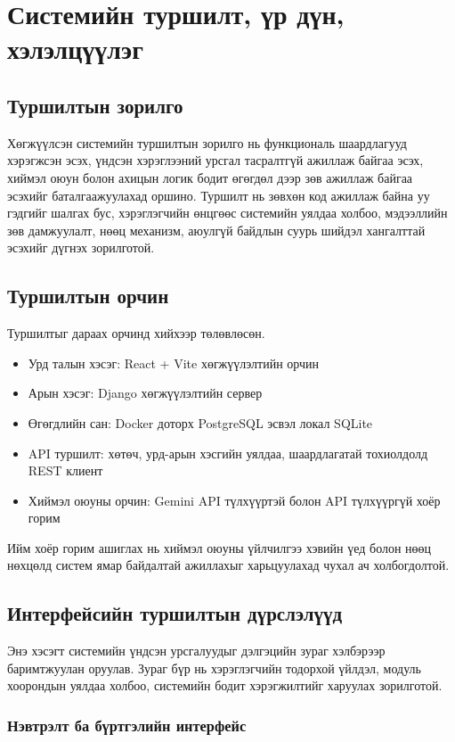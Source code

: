 \chapter{Системийн туршилт, үр дүн, хэлэлцүүлэг}
\label{Chapter4}

\section{Туршилтын зорилго}
Хөгжүүлсэн системийн туршилтын зорилго нь функциональ шаардлагууд хэрэгжсэн эсэх, үндсэн хэрэглээний урсгал тасралтгүй ажиллаж байгаа эсэх, хиймэл оюун болон ахицын логик бодит өгөгдөл дээр зөв ажиллаж байгаа эсэхийг баталгаажуулахад оршино. Туршилт нь зөвхөн код ажиллаж байна уу гэдгийг шалгах бус, хэрэглэгчийн өнцгөөс системийн уялдаа холбоо, мэдээллийн зөв дамжуулалт, нөөц механизм, аюулгүй байдлын суурь шийдэл хангалттай эсэхийг дүгнэх зорилготой.

\section{Туршилтын орчин}
Туршилтыг дараах орчинд хийхээр төлөвлөсөн.
\begin{itemize}
\item Урд талын хэсэг: React + Vite хөгжүүлэлтийн орчин
\item Арын хэсэг: Django хөгжүүлэлтийн сервер
\item Өгөгдлийн сан: Docker доторх PostgreSQL эсвэл локал SQLite
\item API туршилт: хөтөч, урд-арын хэсгийн уялдаа, шаардлагатай тохиолдолд REST клиент
\item Хиймэл оюуны орчин: Gemini API түлхүүртэй болон API түлхүүргүй хоёр горим
\end{itemize}

Ийм хоёр горим ашиглах нь хиймэл оюуны үйлчилгээ хэвийн үед болон нөөц нөхцөлд систем ямар байдалтай ажиллахыг харьцуулахад чухал ач холбогдолтой.

\section{Интерфейсийн туршилтын дүрслэлүүд}
Энэ хэсэгт системийн үндсэн урсгалуудыг дэлгэцийн зураг хэлбэрээр баримтжуулан оруулав. Зураг бүр нь хэрэглэгчийн тодорхой үйлдэл, модуль хоорондын уялдаа холбоо, системийн бодит хэрэгжилтийг харуулах зорилготой.

\subsection{Нэвтрэлт ба бүртгэлийн интерфейс}

